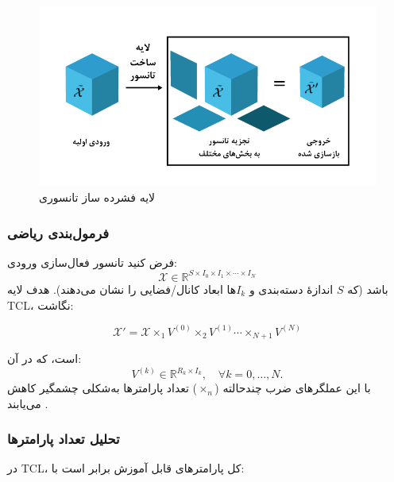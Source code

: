 \begin{figure}[h]
	\centering
	\begin{minipage}[b]{0.7\textwidth}
		\centering
		\includegraphics[width=\textwidth]{transformer_images/persian images/b14.png}
		\caption{لایه فشرده ساز تانسوری}
		\label{fig:tensor_contraction_layer}
	\end{minipage}
	\hfill
\end{figure}




\subsubsection*{فرمول‌بندی ریاضی}

فرض کنید تانسور فعال‌سازی ورودی:
\[
\mathcal{X} \in \mathbb{R}^{S \times I_0 \times I_1 \times \cdots \times I_N}
\]
باشد (که \(S\) اندازهٔ دسته‌بندی و \(I_k\)ها ابعاد کانال/فضایی را نشان می‌دهند). هدف لایه TCL، نگاشت:

\begin{equation}
	\mathcal{X}' = \mathcal{X} \times_1 V^{(0)} \times_2 V^{(1)} \cdots \times_{N+1} V^{(N)}
\end{equation}


است، که در آن:
\[
V^{(k)} \in \mathbb{R}^{R_k \times I_k}, \quad \forall k = 0,\dots,N.
\]
با این عملگرهای ضرب چندحالته (\(\times_n\)) تعداد پارامترها به‌شکلی چشمگیر کاهش می‌یابند \cite{kossaifi2017tensorcontraction}.







\subsubsection*{تحلیل تعداد پارامترها}

در TCL، کل پارامترهای قابل آموزش برابر است با:

